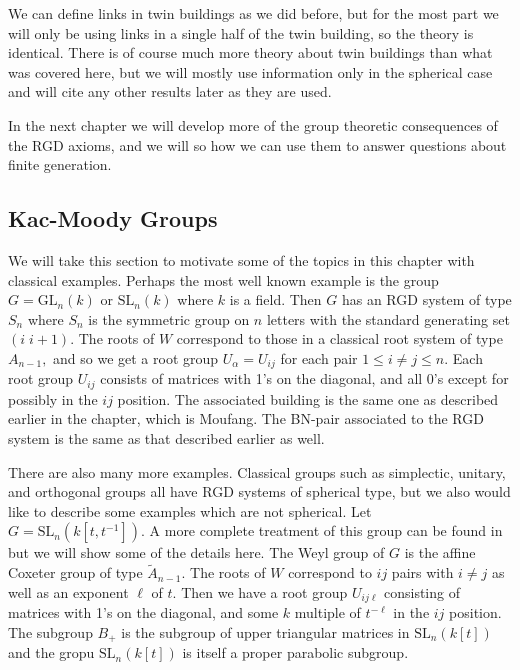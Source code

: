 \documentclass[class=book, crop=false,12 pt]{standalone}
\begin{document}
We can define links in twin buildings as we did before, but for the most part we will only be using links in a single half of the twin building, so the theory is identical. There is of course much more theory about twin buildings than what was covered here, but we will mostly use information only in the spherical case and will cite any other results later as they are used.

In the next chapter we will develop more of the group theoretic consequences of the RGD axioms, and we will so how we can use them to answer questions about finite generation.

\subsection{Kac-Moody Groups}
We will take this section to motivate some of the topics in this chapter with classical examples. Perhaps the most well known example is the group $G=\mathrm{GL}_n(k)$ or $\mathrm{SL}_n(k)$ where $k$ is a field. Then $G$ has an RGD system of type $S_n$ where $S_n$ is the symmetric group on $n$ letters with the standard generating set $(i\;i+1).$ The roots of $W$ correspond to those in a classical root system of type $A_{n-1},$ and so we get a root group $U_\alpha=U_{ij}$ for each pair $1\le i\neq j\le n.$ Each root group $U_{ij}$ consists of matrices with 1's on the diagonal, and all 0's except for possibly in the $ij$ position. The associated building is the same one as described earlier in the chapter, which is Moufang. The BN-pair associated to the RGD system is the same as that described earlier as well.

There are also many more examples. Classical groups such as simplectic, unitary, and orthogonal groups all have RGD systems of spherical type, but we also would like to describe some examples which are not spherical. Let $G=\mathrm{SL}_n(k[t,t^{-1}]).$ A more complete treatment of this group can be found in \cite{sarith} but we will show some of the details here. The Weyl group of $G$ is the affine Coxeter group of type $\tilde{A}_{n-1}.$ The roots of $W$ correspond to $ij$ pairs with $i\neq j$ as well as an exponent $\ell$ of $t.$ Then we have a root group $U_{ij\ell}$ consisting of matrices with 1's on the diagonal, and some $k$ multiple of $t^{-\ell}$ in the $ij$ position. The subgroup $B_+$ is the subgroup of upper triangular matrices in $\mathrm{SL}_n(k[t])$ and the gropu $\mathrm{SL}_n(k[t])$ is itself a proper parabolic subgroup.
\end{document}

